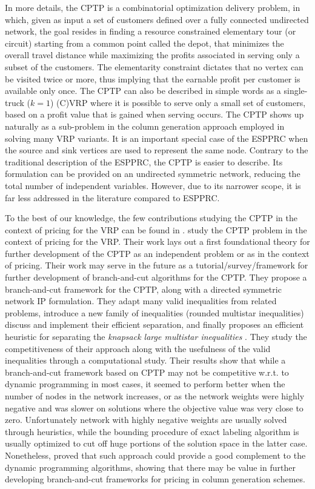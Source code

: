 In more details,
the CPTP is a combinatorial optimization delivery problem,
in which,
given as input a set of customers
defined over a fully connected undirected network, the goal resides in finding
a resource constrained elementary tour (or circuit) starting from a common point called the depot,
that minimizes the overall travel distance while maximizing
the profits associated in serving only a subset of the customers.
The elementarity constraint dictates that no vertex
can be visited twice or more, thus implying that the earnable profit
per customer is available only once.
The CPTP can also be described in simple words
as a single-truck ($k = 1$) (C)VRP where it is possible to serve only a small set of customers,
based on a profit value that is gained when serving occurs.
The CPTP shows up naturally as a sub-problem
in the column generation approach employed in solving many VRP variants.
It is an important special case of the
ESPPRC when the source and sink vertices are used to represent the same node.
Contrary to the traditional description of the ESPPRC,
the CPTP is easier to describe.
Its formulation can be provided on an undirected symmetric network,
reducing the total number of independent variables.
However, due to its narrower scope,
it is far less addressed in the literature compared to ESPPRC.

To the best of our knowledge, the few contributions studying the CPTP
in the context of pricing for the VRP can be found in \textcite{bixby1999, jepsen2008,jepsen2011,jepsen2014}.
\textcite{jepsen2014} study the CPTP problem in the context of pricing for the VRP.
Their work lays out a first foundational theory for further development
of the CPTP as an independent problem or as in the context of pricing.
Their work may serve in the future as a tutorial/survey/framework
for further development of branch-and-cut algorithms for the CPTP.
They propose a branch-and-cut framework for the CPTP,
along with a directed symmetric network IP formulation.
They adapt many valid inequalities from related problems,
introduce a new family of inequalities (rounded multistar inequalities)
discuss and implement their efficient separation,
and finally proposes an efficient heuristic for separating
the \textit{knapsack large multistar inequalities} \parencite{letchford2002}.
They study the competitiveness of their approach
along with the usefulness of the valid inequalities through a computational study.
Their results show that while a branch-and-cut framework based on CPTP may
not be competitive w.r.t. to dynamic programming in most cases,
it seemed to perform better when the number of nodes in the network increases,
or as the network weights were highly negative
and was slower on solutions where the objective value was very close to zero.
Unfortunately network with highly negative weights are usually
solved through heuristics,
while the bounding procedure of exact labeling algorithm is usually optimized
to cut off huge portions of the solution space in the latter case.
Nonetheless, \textcite{jepsen2014}
proved that such approach could provide a good complement
to the dynamic programming algorithms,
showing that there may be value in further developing
branch-and-cut frameworks for pricing in column generation schemes.

